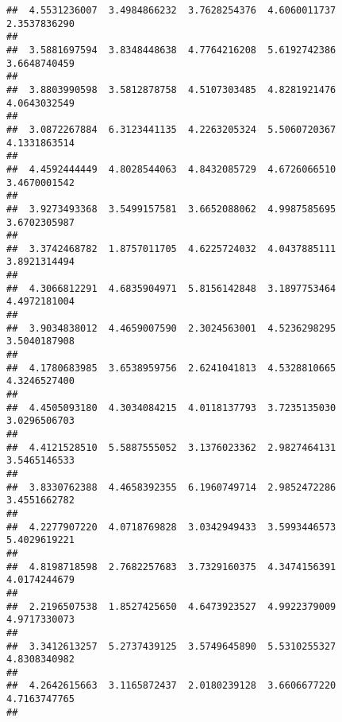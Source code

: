 \documentclass[]{article}
\begin{document}
\begin{verbatim}
##  4.5531236007  3.4984866232  3.7628254376  4.6060011737  2.3537836290 
##                                                                       
##  3.5881697594  3.8348448638  4.7764216208  5.6192742386  3.6648740459 
##                                                                       
##  3.8803990598  3.5812878758  4.5107303485  4.8281921476  4.0643032549 
##                                                                       
##  3.0872267884  6.3123441135  4.2263205324  5.5060720367  4.1331863514 
##                                                                       
##  4.4592444449  4.8028544063  4.8432085729  4.6726066510  3.4670001542 
##                                                                       
##  3.9273493368  3.5499157581  3.6652088062  4.9987585695  3.6702305987 
##                                                                       
##  3.3742468782  1.8757011705  4.6225724032  4.0437885111  3.8921314494 
##                                                                       
##  4.3066812291  4.6835904971  5.8156142848  3.1897753464  4.4972181004 
##                                                                       
##  3.9034838012  4.4659007590  2.3024563001  4.5236298295  3.5040187908 
##                                                                       
##  4.1780683985  3.6538959756  2.6241041813  4.5328810665  4.3246527400 
##                                                                       
##  4.4505093180  4.3034084215  4.0118137793  3.7235135030  3.0296506703 
##                                                                       
##  4.4121528510  5.5887555052  3.1376023362  2.9827464131  3.5465146533 
##                                                                       
##  3.8330762388  4.4658392355  6.1960749714  2.9852472286  3.4551662782 
##                                                                       
##  4.2277907220  4.0718769828  3.0342949433  3.5993446573  5.4029619221 
##                                                                       
##  4.8198718598  2.7682257683  3.7329160375  4.3474156391  4.0174244679 
##                                                                       
##  2.2196507538  1.8527425650  4.6473923527  4.9922379009  4.9717330073 
##                                                                       
##  3.3412613257  5.2737439125  3.5749645890  5.5310255327  4.8308340982 
##                                                                       
##  4.2642615663  3.1165872437  2.0180239128  3.6606677220  4.7163747765 
##                                                                       

\end{verbatim}
\end{document}
